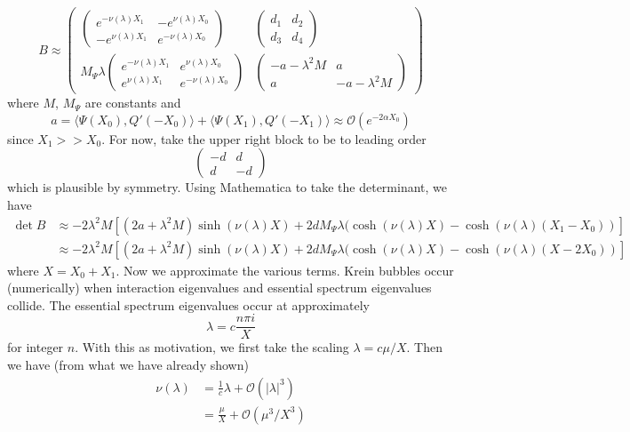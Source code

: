 \documentclass[thesis.tex]{subfiles}
\begin{document}
\[
B \approx \begin{pmatrix}
\begin{pmatrix}
e^{-\nu(\lambda)X_1} & -e^{\nu(\lambda)X_0} \\
-e^{\nu(\lambda)X_1} & e^{-\nu(\lambda)X_0} 
\end{pmatrix} &
\begin{pmatrix}
d_1 & d_2 \\ d_3 & d_4
\end{pmatrix} \\
M_\Psi \lambda
\begin{pmatrix}
e^{-\nu(\lambda)X_1} & e^{\nu(\lambda)X_0} \\
e^{\nu(\lambda)X_1} & e^{-\nu(\lambda)X_0} 
\end{pmatrix} &
\begin{pmatrix}
-a - \lambda^2 M & a \\
a & -a - \lambda^2 M
\end{pmatrix}
\end{pmatrix}
\]
where $M$, $M_\Psi$ are constants and
\[
a = \langle \Psi(X_0), Q'(-X_0) \rangle
+ \langle \Psi(X_1), Q'(-X_1) \rangle \approx \mathcal{O}(e^{-2\alpha X_0})
\]
since $X_1 >> X_0$. For now, take the upper right block to be to leading order
\[
\begin{pmatrix}
-d & d \\ d & -d
\end{pmatrix} 
\] 
which is plausible by symmetry. Using Mathematica to take the determinant, we have
\begin{align*}
\det B &\approx -2 \lambda^2 M \left[ (2a + \lambda^2 M) \sinh(\nu(\lambda)X) + 2 d M_\Psi \lambda 
(\cosh(\nu(\lambda)X) - \cosh(\nu(\lambda)(X_1 - X_0))
\right] \\
&\approx -2 \lambda^2 M \left[ (2a + \lambda^2 M) \sinh(\nu(\lambda)X) + 2 d M_\Psi \lambda 
(\cosh(\nu(\lambda)X) - \cosh(\nu(\lambda)(X - 2 X_0))
\right]
\end{align*}
where $X = X_0 + X_1$. Now we approximate the various terms. Krein bubbles occur (numerically) when interaction eigenvalues and essential spectrum eigenvalues collide. The essential spectrum eigenvalues occur at approximately 
\[
\lambda = c \frac{n \pi i}{X}
\]
for integer $n$. With this as motivation, we first take the scaling $\lambda = c \mu / X$. Then we have (from what we have already shown)
\begin{align*}
\nu(\lambda) &= \frac{1}{c} \lambda + \mathcal{O}(|\lambda|^3) 
\\
&= \frac{\mu}{X} + \mathcal{O}(\mu^3 / X^3)
\end{align*}
\end{document}

